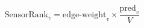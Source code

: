 \documentclass{scrartcl}
\begin{document}
\[
  \text{SensorRank}_v = \text{edge-weight}_v \times \frac{\text{pred}_v}{V}
\]
\end{document}
